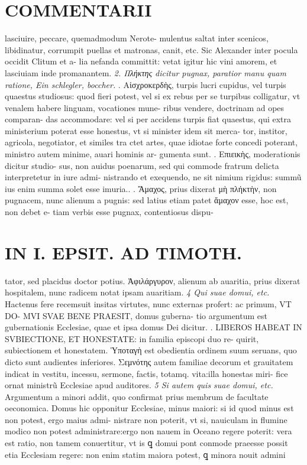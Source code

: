 \documentclass{article}
\begin{document}
\begin{pages}
\section*{COMMENTARII }\pstart lasciuire, peccare, quemadmodum Nerote- mulentus saltat inter scenicos, libidinatur, corrumpit puellas et matronas, canit, etc. Sic Alexander inter pocula occidit Clitum et a- lia nefanda committit: vetat igitur hic vini amorem, et lasciuiam inde promanantem.  \pend
\textit{2. Πλήκτης dicitur pugnax, paratior manu quam ratione, Ein schlegler, boccher. }. Αἰσχροκερδὴς, turpis lucri cupidus, vel turpis quaestus studiosus: quod fieri potest, vel si ex rebus per se turpibus colligatur, vt venalem habere linguam, vocationes mune- ribus vendere, doctrinam ad opes comparan- das accommodare: vel si per accidens turpis fiat quaestus, qui extra ministerium poterat esse honestus, vt si minister idem sit merca- tor, institor, agricola, negotiator, et similes tra ctet artes, quae idiotae forte concedi poterant, ministro autem minime, auari hominis ar- gumenta sunt.  \pend{}. Επιεικὴς, moderationis dicitur studio- sus, non auidus poenarum, sed qui commode fratrum delicta interpretetur in iure admi- nistrando et exequendo, ne sit nimium rigidus: summũ ius enim summa solet esse imuria..  \pend{}. Ἄμαχος, prius dixerat μὴ πλήκτὴν, non pugnacem, nunc alienum a pugnis: sed latius etiam patet ἄμαχον esse, hoc est, non debet e- tiam verbis esse pugnax, contentiosus dispu-  \pend
\section*{IN I. EPSIT. AD TIMOTH. }
\marginpar{[ p.67 ]}\pstart tator, sed placidus doctor potius.  \pend{} Ἀφιλάργυρον, alienum ab auaritia, prius dixerat hospitalem, nunc radicem notat ipsam auaritiam.  \pend
\textit{4 Qui suae domui, etc. }\pstart Hactenus fere recemsuit insitas virtutes, nunc externas profert: ac primum, VT DO- MVI SVAE BENE PRAESIT, domus guberna- tio argumentum est gubernationis Ecclesiae, quae et ipsa domus Dei dicitur.  \pend{}. LIBEROS HABEAT IN SVBIECTIONE, ET HONESTATE: in familia episcopi duo re- quirit, subiectionem et honestatem. Ὑποταγὴ est obedientia ordinem suum seruans, quo dicto sunt audientes inferiores. Σεμνότης autem familiae decorum et grauitatem indicat in vestitu, incessu, sermone, factis, totamq. vita:illa honestas miri- fice ornat ministrũ Ecclesiae apud auditores.  \pend
\textit{5 Si autem quis suae domui, etc. }\pstart Argumentum a minori addit, quo confirmat prius membrum de facultate oeconomica. Domus hic opponitur Ecclesiae, minus maiori: si id quod minus est non potest, ergo maius admi- nistrare non poterit, vt si, nauiculam in flumine modico non potest administrare:ergo non nauem in Oceano regere poterit: vera est ratio, non tamem conuertitur, vt is ꝗ domui pont conmode praeesse possit etia Ecclesiam regere: non enim statim maiora potest, ꝗ minora nouit admini  \pend
\marginpar{[ p.68 ]}

\end{pages}
\end{document}
